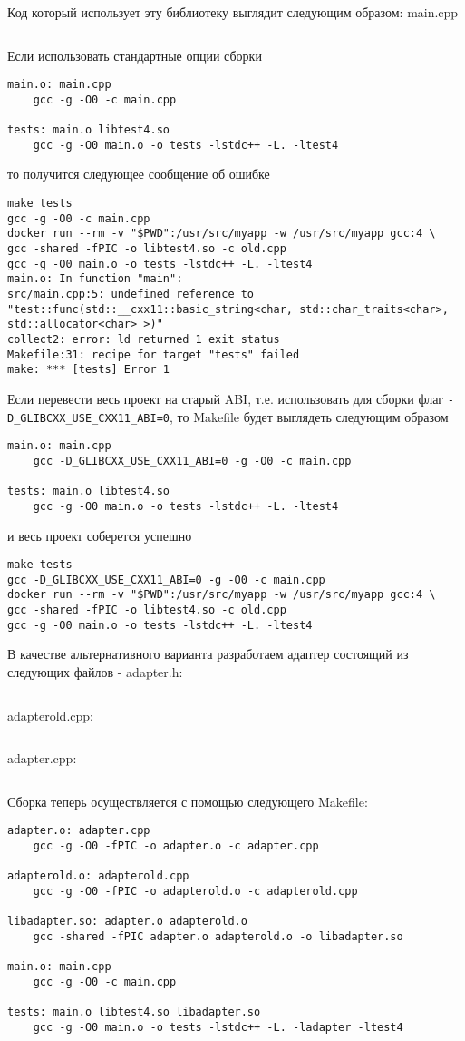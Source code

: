 \documentclass[14pt,a4paper]{article}
\begin{document}
Код который использует эту библиотеку выглядит следующим образом: main.cpp
\inputminted{c++}{./src/main.cpp}

Если использовать стандартные опции сборки
\begin{verbatim}
main.o: main.cpp
	gcc -g -O0 -c main.cpp 

tests: main.o libtest4.so
	gcc -g -O0 main.o -o tests -lstdc++ -L. -ltest4
\end{verbatim}
то получится следующее сообщение об ошибке
\begin{verbatim}
make tests
gcc -g -O0 -c main.cpp 
docker run --rm -v "$PWD":/usr/src/myapp -w /usr/src/myapp gcc:4 \
gcc -shared -fPIC -o libtest4.so -c old.cpp
gcc -g -O0 main.o -o tests -lstdc++ -L. -ltest4
main.o: In function "main":
src/main.cpp:5: undefined reference to 
"test::func(std::__cxx11::basic_string<char, std::char_traits<char>, 
std::allocator<char> >)"
collect2: error: ld returned 1 exit status
Makefile:31: recipe for target "tests" failed
make: *** [tests] Error 1
\end{verbatim}


Если перевести весь проект на старый ABI, т.е. использовать для сборки
флаг \texttt{-D\_GLIBCXX\_USE\_CXX11\_ABI=0}, то Makefile будет выглядеть
следующим образом
\begin{verbatim}
main.o: main.cpp
	gcc -D_GLIBCXX_USE_CXX11_ABI=0 -g -O0 -c main.cpp

tests: main.o libtest4.so
	gcc -g -O0 main.o -o tests -lstdc++ -L. -ltest4
\end{verbatim}
и весь проект соберется успешно
\begin{verbatim}
make tests
gcc -D_GLIBCXX_USE_CXX11_ABI=0 -g -O0 -c main.cpp 
docker run --rm -v "$PWD":/usr/src/myapp -w /usr/src/myapp gcc:4 \
gcc -shared -fPIC -o libtest4.so -c old.cpp
gcc -g -O0 main.o -o tests -lstdc++ -L. -ltest4
\end{verbatim}

В качестве альтернативного варианта разработаем адаптер состоящий из
следующих файлов - adapter.h:
\inputminted{c++}{./src/adapter.h}
adapterold.cpp:
\inputminted{c++}{./src/adapterold.cpp}
adapter.cpp:
\inputminted{c++}{./src/adapter.cpp}

Сборка теперь осуществляется с помощью следующего Makefile:
\begin{verbatim}
adapter.o: adapter.cpp
	gcc -g -O0 -fPIC -o adapter.o -c adapter.cpp

adapterold.o: adapterold.cpp
	gcc -g -O0 -fPIC -o adapterold.o -c adapterold.cpp

libadapter.so: adapter.o adapterold.o
	gcc -shared -fPIC adapter.o adapterold.o -o libadapter.so 

main.o: main.cpp
	gcc -g -O0 -c main.cpp 

tests: main.o libtest4.so libadapter.so
	gcc -g -O0 main.o -o tests -lstdc++ -L. -ladapter -ltest4
\end{verbatim}
\end{document}
